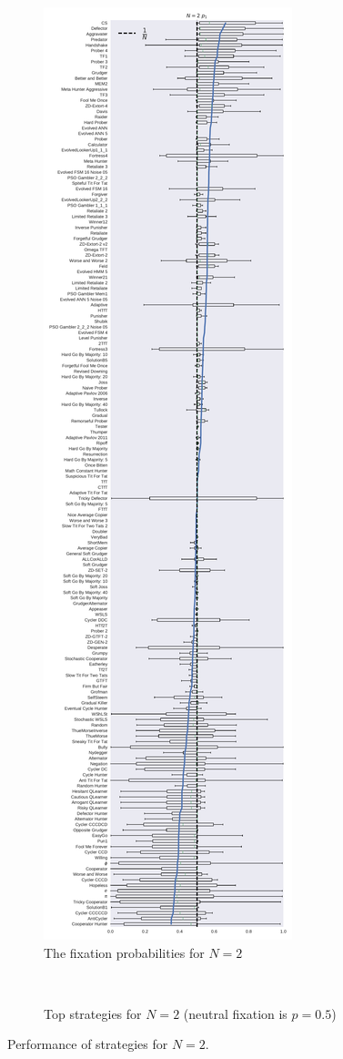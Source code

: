 \documentclass{article}
\begin{document}
\begin{figure}[!hbtp]
    \begin{subfigure}{.5\textwidth}
        \centering
        \includegraphics[height=.7\textheight]{./img/boxplot_2_invade.pdf}
        \caption{The fixation probabilities for \(N=2\)}
        \label{fig:boxplot_2}
    \end{subfigure}%
    ~
    \begin{subfigure}{.5\textwidth}
        \scriptsize
        \centering
        
        \caption{Top strategies for \(N=2\) (neutral fixation is \(p=0.5\))}
        \label{tbl:summary_top_2}
    \end{subfigure}
    \caption{Performance of strategies for \(N=2\).}
\end{figure}
\end{document}
